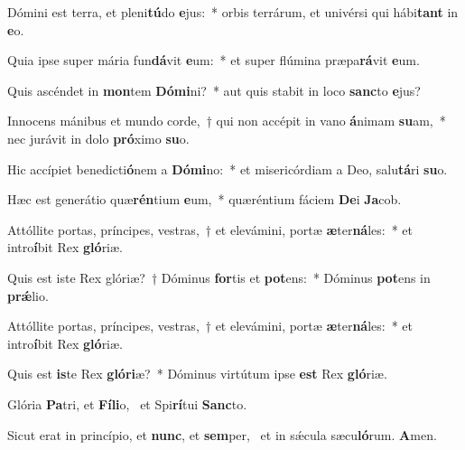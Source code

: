 \item Dómini est terra, et pleni\textbf{tú}do \textbf{e}jus:~* orbis terrárum, et univérsi qui hábi\textbf{tant} in \textbf{e}o.
\item Quia ipse super mária fun\textbf{dá}vit \textbf{e}um:~* et super flúmina præpa\textbf{rá}vit \textbf{e}um.
\item Quis ascéndet in \textbf{mon}tem \textbf{Dó}\textbf{mi}ni?~* aut quis stabit in loco \textbf{sanc}to \textbf{e}jus?
\item Innocens mánibus et mundo corde,~† qui non accépit in vano \textbf{á}nimam \textbf{su}am,~* nec jurávit in dolo \textbf{pró}ximo \textbf{su}o.
\item Hic accípiet benedicti\textbf{ó}nem a \textbf{Dó}\textbf{mi}no:~* et misericórdiam a Deo, salu\textbf{tá}ri \textbf{su}o.
\item Hæc est generátio quæ\textbf{rén}tium \textbf{e}um,~* quæréntium fáciem \textbf{De}i \textbf{Ja}cob.
\item Attóllite portas, príncipes, vestras,~† et elevámini, portæ \textbf{æ}ter\textbf{ná}les:~* et intro\textbf{í}bit Rex \textbf{gló}riæ.
\item Quis est iste Rex glóriæ?~† Dóminus \textbf{for}tis et \textbf{pot}ens:~* Dóminus \textbf{pot}ens in \textbf{prǽ}lio.
\item Attóllite portas, príncipes, vestras,~† et elevámini, portæ \textbf{æ}ter\textbf{ná}les:~* et intro\textbf{í}bit Rex \textbf{gló}riæ.
\item Quis est \textbf{is}te Rex \textbf{gló}\textbf{ri}æ?~* Dóminus virtútum ipse \textbf{est} Rex \textbf{gló}riæ.
\item Glória \textbf{Pa}tri, et \textbf{Fí}\textbf{li}o,~\psstar{} et Spi\textbf{rí}tui \textbf{Sanc}to.
\item Sicut erat in princípio, et \textbf{nunc}, et \textbf{sem}per,~\psstar{} et in sǽcula sæcu\textbf{ló}rum. \textbf{A}men.